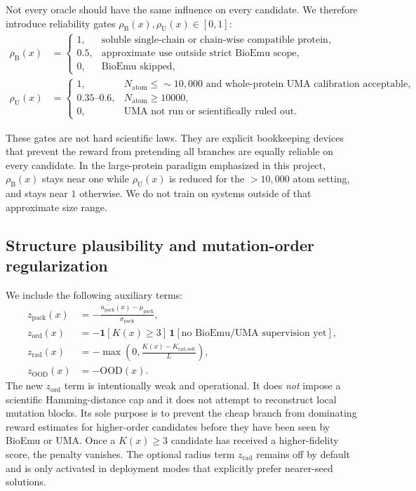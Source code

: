 \documentclass[11pt]{article}
\newcommand{\packunc}{\ensuremath{u_{\mathrm{pack}}}}
\begin{document}
	Not every oracle should have the same influence on every candidate. We therefore introduce reliability gates $\rho_{\mathrm B}(x),\rho_{\mathrm U}(x)\in[0,1]$:
	\begin{align}
		\rho_{\mathrm B}(x) &=
		\begin{cases}
			1, & \text{soluble single-chain or chain-wise compatible protein},\\
			0.5, & \text{approximate use outside strict BioEmu scope},\\
			0, & \text{BioEmu skipped},
		\end{cases}\\
		\rho_{\mathrm U}(x) &=
		\begin{cases}
			1, & N_{\mathrm{atom}}\leq \sim 10,000 \text{ and whole-protein UMA calibration acceptable},\\
			0.35\text{--}0.6, &  N_{\mathrm{atom}}\geq 10000,\\
			0, & \text{UMA not run or scientifically ruled out}.
		\end{cases}
	\end{align}
	
	These gates are not hard scientific laws. They are explicit bookkeeping devices that prevent the reward from pretending all branches are equally reliable on every candidate. In the large-protein paradigm emphasized in this project, $\rho_{\mathrm B}(x)$ stays near one while $\rho_{\mathrm U}(x)$ is reduced for the $> 10,000$ atom setting, and stays near $1$ otherwise. We do not train on systems outside of that approximate size range. 
	
	
	\subsection{Structure plausibility and mutation-order regularization}
	
	We include the following auxiliary terms:
	\begin{align}
		z_{\mathrm{pack}}(x) &= -\frac{\overline{\packunc}(x)-\mu_{\mathrm{pack}}}{\sigma_{\mathrm{pack}}},\\
		z_{\mathrm{ord}}(x) &= -\mathbf{1}[K(x)\ge 3]\,\mathbf{1}[\text{no BioEmu/UMA supervision yet}],\\
		z_{\mathrm{rad}}(x) &= -\max\!\left(0,\frac{K(x)-K_{\mathrm{rad,soft}}}{L}\right),\\
		z_{\mathrm{OOD}}(x) &= -\mathrm{OOD}(x).
	\end{align}
	The new $z_{\mathrm{ord}}$ term is intentionally weak and operational. It does \emph{not} impose a scientific Hamming-distance cap and it does not attempt to reconstruct local mutation blocks. Its sole purpose is to prevent the cheap branch from dominating reward estimates for higher-order candidates before they have been seen by BioEmu or UMA. Once a $K(x)\ge 3$ candidate has received a higher-fidelity score, the penalty vanishes. The optional radius term $z_{\mathrm{rad}}$ remains off by default and is only activated in deployment modes that explicitly prefer nearer-seed solutions.
	
\end{document}
